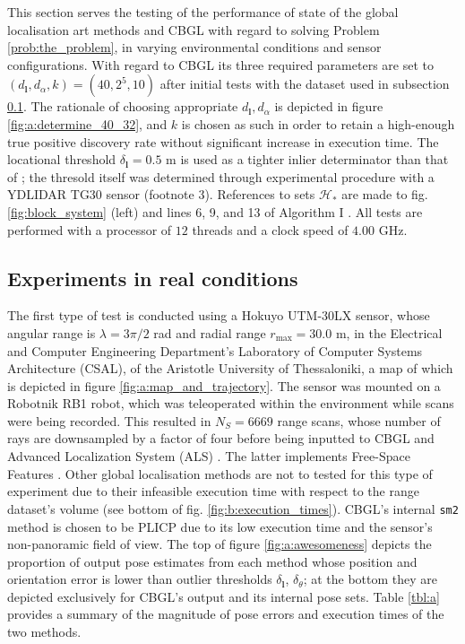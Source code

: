 This section serves the testing of the performance of state of the global
localisation art methods and CBGL with regard to solving Problem
\ref{prob:the_problem}, in varying environmental conditions and sensor
configurations. With regard to CBGL its three required parameters are set to
$(d_{\bm{l}},d_{\alpha},k) = (40, 2^5, 10)$ after initial tests with the
dataset used in subsection \ref{subsec:exp_a}.  The rationale of choosing
appropriate $d_{\bm{l}},d_{\alpha}$ is depicted in figure
\ref{fig:a:determine_40_32}, and $k$ is chosen as such in order to retain a
high-enough true positive discovery rate without significant increase in
execution time. The locational threshold $\delta_{\bm{l}} = 0.5$ m is used as
a tighter inlier determinator than that of \cite{Filotheou2022g}; the thresold
itself was determined through experimental procedure with a YDLIDAR TG30 sensor
(footnote 3).
References to sets $\mathcal{H}_{\ast}$ are made to fig. \ref{fig:block_system}
(left) and lines
6, 9, and 13 of Algorithm
I \cite{Filotheou2023c}. All tests are performed with a processor of $12$
threads and a clock speed of $4.00$ GHz.


\subsection{Experiments in real conditions}
\label{subsec:exp_a}

The first type of test is conducted using a Hokuyo UTM-30LX sensor, whose
angular range is $\lambda = 3\pi/2$ rad and radial range $r_{\max} = 30.0$ m,
in the  Electrical and Computer Engineering Department's Laboratory of Computer
Systems Architecture (CSAL), of the Aristotle University of Thessaloniki, a map of
which is depicted in figure \ref{fig:a:map_and_trajectory}. The sensor was
mounted on a Robotnik RB1 robot, which was teleoperated within the environment
while scans were being recorded.  This resulted in $N_{S}=6669$ range scans,
whose number of rays are downsampled by a factor of four before being inputted
to CBGL and Advanced Localization System (ALS) \cite{als_jp}. The latter
implements Free-Space Features \cite{als_eth}. Other global localisation
methods are not to tested for this type of experiment due to their infeasible
execution time with respect to the range dataset's volume (see bottom of fig.
\ref{fig:b:execution_times}). CBGL's internal \texttt{sm2} method is chosen to
be PLICP \cite{Censi2008c} due to its low execution time and the sensor's
non-panoramic field of view. The top of figure \ref{fig:a:awesomeness} depicts
the proportion of output pose estimates from each method whose position and
orientation error is lower than outlier thresholds $\delta_{\bm{l}}$,
$\delta_{\theta}$; at the bottom they are depicted exclusively for CBGL's
output and its internal pose sets. Table \ref{tbl:a} provides a summary of the
magnitude of pose errors and execution times of the two methods.

